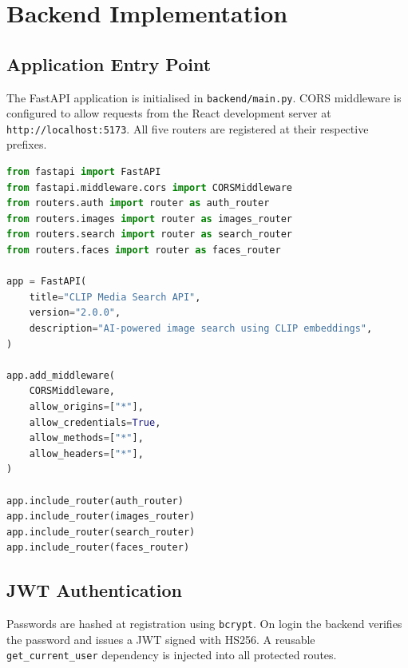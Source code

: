 \documentclass[12pt,a4paper,oneside]{report}
\begin{document}
\section{Backend Implementation}

\subsection{Application Entry Point}
The FastAPI application is initialised in \texttt{backend/main.py}.
CORS middleware is configured to allow requests from the React development
server at \texttt{http://localhost:5173}.  All five routers are registered
at their respective prefixes.

\begin{lstlisting}[language=Python, caption={FastAPI application
  initialisation and router registration (main.py)}]
from fastapi import FastAPI
from fastapi.middleware.cors import CORSMiddleware
from routers.auth import router as auth_router
from routers.images import router as images_router
from routers.search import router as search_router
from routers.faces import router as faces_router

app = FastAPI(
    title="CLIP Media Search API",
    version="2.0.0",
    description="AI-powered image search using CLIP embeddings",
)

app.add_middleware(
    CORSMiddleware,
    allow_origins=["*"],
    allow_credentials=True,
    allow_methods=["*"],
    allow_headers=["*"],
)

app.include_router(auth_router)
app.include_router(images_router)
app.include_router(search_router)
app.include_router(faces_router)
\end{lstlisting}

\subsection{JWT Authentication}
Passwords are hashed at registration using \texttt{bcrypt}.  On login the
backend verifies the password and issues a JWT signed with HS256.  A
reusable \texttt{get\_current\_user} dependency is injected into all
protected routes.
\end{document}
